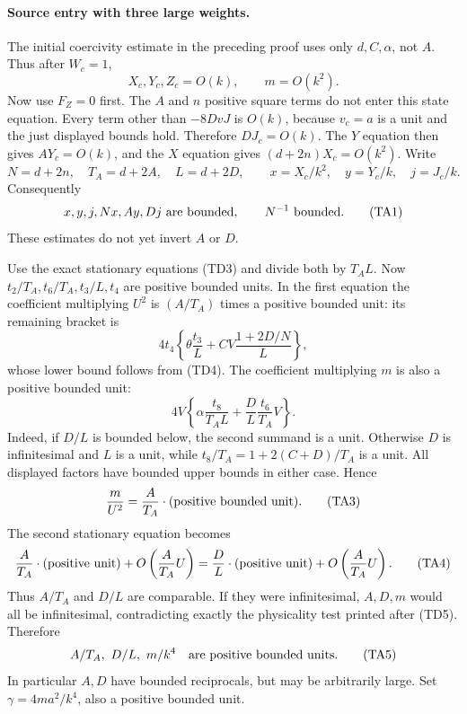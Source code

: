\paragraph{Source entry with three large weights.}
The initial coercivity estimate in the preceding proof uses only
$d,C,\alpha$, not $A$. Thus after $W_c=1$,
\[
 X_c,Y_c,Z_c=O(k),\qquad m=O(k^2).
\]
Now use $F_Z=0$ first. The $A$ and $n$ positive square terms do not enter this
state equation. Every term other than $-8DvJ$ is $O(k)$, because
$v_c=a$ is a unit and the just displayed bounds hold. Therefore
$DJ_c=O(k)$. The $Y$ equation then gives $AY_c=O(k)$, and the $X$
equation gives $(d+2n)X_c=O(k^2)$. Write
\[
 N=d+2n,\quad T_A=d+2A,\quad L=d+2D,\qquad
 x=X_c/k^2,\quad y=Y_c/k,\quad j=J_c/k.
\]
Consequently
\[
 x,y,j,Nx,Ay,Dj\ \hbox{are bounded},\qquad N^{-1}\ \hbox{bounded}.
                                                               \tag{TA1}
\]
These estimates do not yet invert $A$ or $D$.

Use the exact stationary equations (TD3) and divide both by
$T_A L$. Now $t_2/T_A,t_6/T_A,t_3/L,t_4$ are positive bounded
units. In the first equation the coefficient multiplying $U^2$ is
$(A/T_A)$ times a positive bounded unit: its remaining bracket is
\[
 4t_4\left\{\theta\frac{t_3}{L}
            +CV\frac{1+2D/N}{L}\right\},
\]
whose lower bound follows from (TD4). The coefficient multiplying
$m$ is also a positive bounded unit:
\[
 4V\left\{\alpha\frac{t_8}{T_A L}
              +\frac{D}{L}\frac{t_6}{T_A}V\right\}.             \tag{TA2}
\]
Indeed, if $D/L$ is bounded below, the second summand is a unit.
Otherwise $D$ is infinitesimal and $L$ is a unit, while
$t_8/T_A=1+2(C+D)/T_A$ is a unit. All displayed factors have
bounded upper bounds in either case. Hence
\[
 \frac{m}{U^2}=\frac{A}{T_A}\cdot(\hbox{positive bounded unit}). \tag{TA3}
\]
The second stationary equation becomes
\[
 \frac{A}{T_A}\cdot(\hbox{positive unit})
       +O\left(\frac{A}{T_A}U\right)
 =\frac{D}{L}\cdot(\hbox{positive unit})
       +O\left(\frac{A}{T_A}U\right).                          \tag{TA4}
\]
Thus $A/T_A$ and $D/L$ are comparable. If they were infinitesimal,
$A,D,m$ would all be infinitesimal, contradicting exactly the
physicality test printed after (TD5). Therefore
\[
 A/T_A,\ D/L,\ m/k^4\quad\hbox{are positive bounded units}.       \tag{TA5}
\]
In particular $A,D$ have bounded reciprocals, but may be arbitrarily
large. Set $\gamma=4ma^2/k^4$, also a positive bounded unit.

